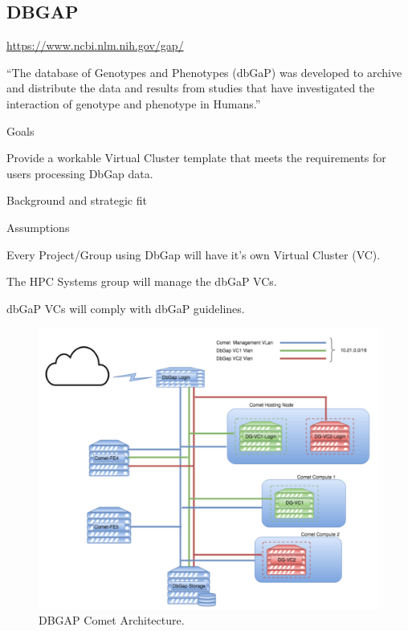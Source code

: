\subsection{DBGAP}

\url{https://www.ncbi.nlm.nih.gov/gap/}

``The database of Genotypes and Phenotypes (dbGaP) was developed to archive and distribute the data and results from studies that have investigated the interaction of genotype and phenotype in Humans.''

\cite{nih-security-best-practice}
\cite{dbgap-access}

Goals

Provide a workable Virtual Cluster template that meets the requirements for users processing DbGap data.

Background and strategic fit

Assumptions

Every Project/Group using DbGap will have it's own Virtual Cluster (VC).

The HPC Systems group will manage the dbGaP VCs.

dbGaP VCs will comply with dbGaP guidelines. 


\begin{figure}[h]
  \centering
  \includegraphics[width=\linewidth]{images/dbgap.png}
  \caption{DBGAP Comet Architecture.}\label{fig:car}
\end{figure}




